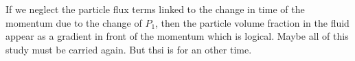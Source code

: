 If we neglect the particle flux terms linked to the change in time of the momentum due to the change of $P_1$, then the particle volume fraction in the fluid appear as a gradient in front of the momentum which is logical. 
Maybe all of this study must be carried again. 
But thsi is for an other time. 